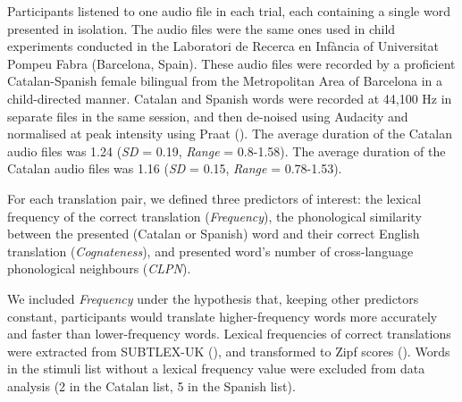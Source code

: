 \documentclass[
]{article}
\begin{document}
Participants listened to one audio file in each trial, each containing a
single word presented in isolation. The audio files were the same ones
used in child experiments conducted in the Laboratori de Recerca en
Infància of Universitat Pompeu Fabra (Barcelona, Spain). These audio
files were recorded by a proficient Catalan-Spanish female bilingual
from the Metropolitan Area of Barcelona in a child-directed manner.
Catalan and Spanish words were recorded at 44,100 Hz in separate files
in the same session, and then de-noised using Audacity and normalised at
peak intensity using Praat (). The average duration of the Catalan audio files was
1.24 (\emph{SD} = 0.19, \emph{Range} = 0.8-1.58). The average duration
of the Catalan audio files was 1.16 (\emph{SD} = 0.15, \emph{Range} =
0.78-1.53).

For each translation pair, we defined three predictors of interest: the
lexical frequency of the correct translation (\emph{Frequency}), the
phonological similarity between the presented (Catalan or Spanish) word
and their correct English translation (\emph{Cognateness}), and
presented word's number of cross-language phonological neighbours
(\emph{CLPN}).

We included \emph{Frequency} under the hypothesis that, keeping other
predictors constant, participants would translate higher-frequency words
more accurately and faster than lower-frequency words. Lexical
frequencies of correct translations were extracted from SUBTLEX-UK
(), and
transformed to Zipf scores (). Words in the stimuli list without a lexical frequency value
were excluded from data analysis (2 in the Catalan list, 5 in the
Spanish list).
\end{document}
